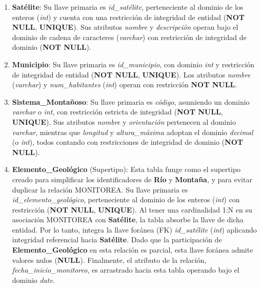 \begin{enumerate}

\item \textbf{Satélite}: Su llave primaria es \textit{id\_satélite}, perteneciente al dominio de los enteros (\textit{int}) y cuenta con una restricción de integridad de entidad (\textbf{NOT NULL}, \textbf{UNIQUE}). Sus atributos \textit{nombre} y \textit{descripción} operan bajo el dominio de cadena de caracteres (\textit{varchar}) con restricción de integridad de dominio (\textbf{NOT NULL}).

\item \textbf{Municipio}: Su llave primaria es \textit{id\_municipio}, con dominio \textit{int} y restricción de integridad de entidad (\textbf{NOT NULL}, \textbf{UNIQUE}). Los atributos \textit{nombre} (\textit{varchar}) y \textit{num\_habitantes} (\textit{int}) operan con restricción \textbf{NOT NULL}.

\item \textbf{Sistema\_Montañoso}: Su llave primaria es \textit{código}, asumiendo un dominio \textit{varchar} o \textit{int}, con restricción estricta de integridad (\textbf{NOT NULL}, \textbf{UNIQUE}). Sus atributos \textit{nombre} y \textit{orientación} pertenecen al dominio \textit{varchar}, mientras que \textit{longitud} y \textit{altura\_máxima} adoptan el dominio \textit{decimal} (o \textit{int}), todos contando con restricciones de integridad de dominio (\textbf{NOT NULL}).

\item \textbf{Elemento\_Geológico} (Supertipo): Esta tabla funge como el supertipo creado para simplificar los identificadores de \textbf{Río} y \textbf{Montaña}, y para evitar duplicar la relación MONITOREA. Su llave primaria es \textit{id\_elemento\_geológico}, perteneciente al dominio de los enteros (\textit{int}) con restricción (\textbf{NOT NULL}, \textbf{UNIQUE}).
Al tener una cardinalidad 1:N en su asociación MONITOREA con \textbf{Satélite}, la tabla absorbe la llave de dicha entidad. Por lo tanto, integra la llave foránea (FK) \textit{id\_satélite} (\textit{int}) aplicando integridad referencial hacia \textbf{Satélite}. Dado que la participación de \textbf{Elemento\_Geológico} en esta relación es parcial, esta llave foránea admite valores nulos (\textbf{NULL}). Finalmente, el atributo de la relación, \textit{fecha\_inicio\_monitoreo}, es arrastrado hacia esta tabla operando bajo el dominio \textit{date}.


\end{enumerate}
